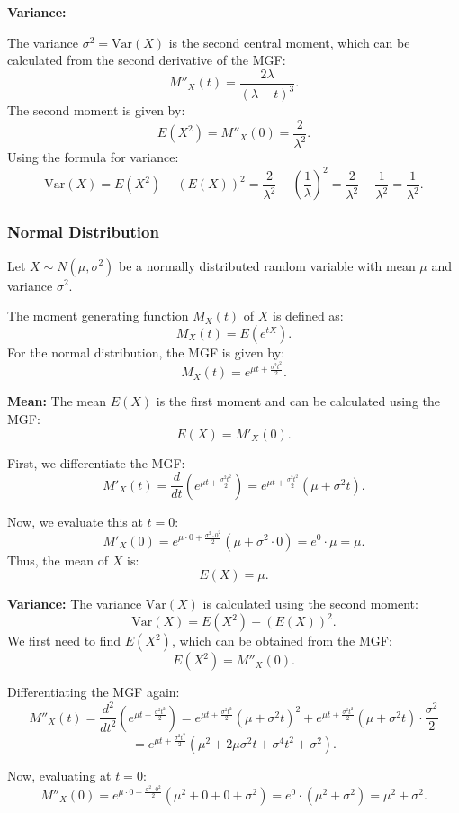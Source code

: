 \textbf{Variance:}

The variance \( \sigma^2 = \text{Var}(X) \) is the second central moment, which can be calculated from the second derivative of the MGF:
\[
M''_X(t) = \frac{2\lambda}{(\lambda - t)^3}.
\]
The second moment is given by:
\[
E(X^2) = M''_X(0) = \frac{2}{\lambda^2}.
\]
Using the formula for variance:
\[
\text{Var}(X) = E(X^2) - (E(X))^2 = \frac{2}{\lambda^2} - \left(\frac{1}{\lambda}\right)^2 = \frac{2}{\lambda^2} - \frac{1}{\lambda^2} = \frac{1}{\lambda^2}.
\]

\subsubsection{Normal Distribution}

Let \( X \sim N(\mu, \sigma^2) \) be a normally distributed random variable with mean \( \mu \) and variance \( \sigma^2 \).

The moment generating function \( M_X(t) \) of \( X \) is defined as:
\[
M_X(t) = E\left(e^{tX}\right).
\]
For the normal distribution, the MGF is given by:
\[
M_X(t) = e^{\mu t + \frac{\sigma^2 t^2}{2}}.
\]

\textbf{Mean:} The mean \( E(X) \) is the first moment and can be calculated using the MGF:
\[
E(X) = M'_X(0).
\]

First, we differentiate the MGF:
\[
M'_X(t) = \frac{d}{dt}\left(e^{\mu t + \frac{\sigma^2 t^2}{2}}\right) = e^{\mu t + \frac{\sigma^2 t^2}{2}}\left(\mu + \sigma^2 t\right).
\]

Now, we evaluate this at \( t = 0 \):
\[
M'_X(0) = e^{\mu \cdot 0 + \frac{\sigma^2 \cdot 0^2}{2}} \left(\mu + \sigma^2 \cdot 0\right) = e^0 \cdot \mu = \mu.
\]
Thus, the mean of \( X \) is:
\[
E(X) = \mu.
\]

\textbf{Variance:} The variance \( \text{Var}(X) \) is calculated using the second moment:
\[
\text{Var}(X) = E(X^2) - (E(X))^2.
\]
We first need to find \( E(X^2) \), which can be obtained from the MGF:
\[
E(X^2) = M''_X(0).
\]

Differentiating the MGF again:
\[
M''_X(t) = \frac{d^2}{dt^2}\left(e^{\mu t + \frac{\sigma^2 t^2}{2}}\right) = e^{\mu t + \frac{\sigma^2 t^2}{2}}\left(\mu + \sigma^2 t\right)^2 + e^{\mu t + \frac{\sigma^2 t^2}{2}} \left(\mu + \sigma^2 t\right) \cdot \frac{\sigma^2}{2} 
\]
\[
    = e^{\mu t + \frac{\sigma^2 t^2}{2}} \left(\mu^2 + 2\mu \sigma^2 t + \sigma^4 t^2 + \sigma^2\right).
\]

Now, evaluating at \( t = 0 \):
\[
M''_X(0) = e^{\mu \cdot 0 + \frac{\sigma^2 \cdot 0^2}{2}} \left(\mu^2 + 0 + 0 + \sigma^2\right) = e^0 \cdot \left(\mu^2 + \sigma^2\right) = \mu^2 + \sigma^2.
\]

